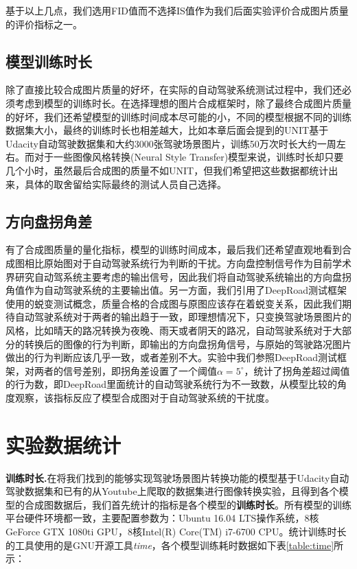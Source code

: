 基于以上几点，我们选用FID值而不选择IS值作为我们后面实验评价合成图片质量的评价指标之一。

\subsection{模型训练时长}

除了直接比较合成图片质量的好坏，在实际的自动驾驶系统测试过程中，我们还必须考虑到模型的训练时长。在选择理想的图片合成框架时，除了最终合成图片质量的好坏，我们还希望模型的训练时间成本尽可能的小，不同的模型根据不同的训练数据集大小，最终的训练时长也相差越大，比如本章后面会提到的UNIT\cite{UNIT}基于Udacity自动驾驶数据集\cite{udacity_dataset}和大约3000张驾驶场景图片，训练50万次时长大约一周左右。而对于一些图像风格转换(Neural Style Transfer)模型来说，训练时长却只要几个小时，虽然最后合成图的质量不如UNIT，但我们希望把这些数据都统计出来，具体的取舍留给实际最终的测试人员自己选择。 

\subsection{方向盘拐角差}

有了合成图质量的量化指标，模型的训练时间成本，最后我们还希望直观地看到合成图相比原始图对于自动驾驶系统行为判断的干扰。方向盘控制信号作为目前学术界研究自动驾系统主要考虑的输出信号，因此我们将自动驾驶系统输出的方向盘拐角值作为自动驾驶系统的主要输出值。另一方面，我们引用了DeepRoad测试框架使用的蜕变测试概念，质量合格的合成图与原图应该存在着蜕变关系，因此我们期待自动驾驶系统对于两者的输出趋于一致，即理想情况下，只变换驾驶场景图片的风格，比如晴天的路况转换为夜晚、雨天或者阴天的路况，自动驾驶系统对于大部分的转换后的图像的行为判断，即输出的方向盘拐角信号，与原始的驾驶路况图片做出的行为判断应该几乎一致，或者差别不大。实验中我们参照DeepRoad测试框架，对两者的信号差别，即拐角差设置了一个阈值$\alpha=5^{\circ}$，统计了拐角差超过阈值的行为数，即DeepRoad里面统计的自动驾驶系统行为不一致数，从模型比较的角度观察，该指标反应了模型合成图对于自动驾驶系统的干扰度。

\section{实验数据统计}

\textbf{训练时长.}\quad 在将我们找到的能够实现驾驶场景图片转换功能的模型基于Udacity自动驾驶数据集\cite{udacity_dataset}和已有的从Youtube上爬取的数据集进行图像转换实验，且得到各个模型的合成图数据后，我们首先统计的指标是各个模型的\textbf{训练时长}。所有模型的训练平台硬件环境都一致，主要配置参数为：Ubuntu 16.04 LTS操作系统，8核GeForce GTX 1080ti GPU，8核Intel(R) Core(TM) i7-6700 CPU。统计训练时长的工具使用的是GNU开源工具\textit{time}，各个模型训练耗时数据如下表\ref{table:time}所示：

